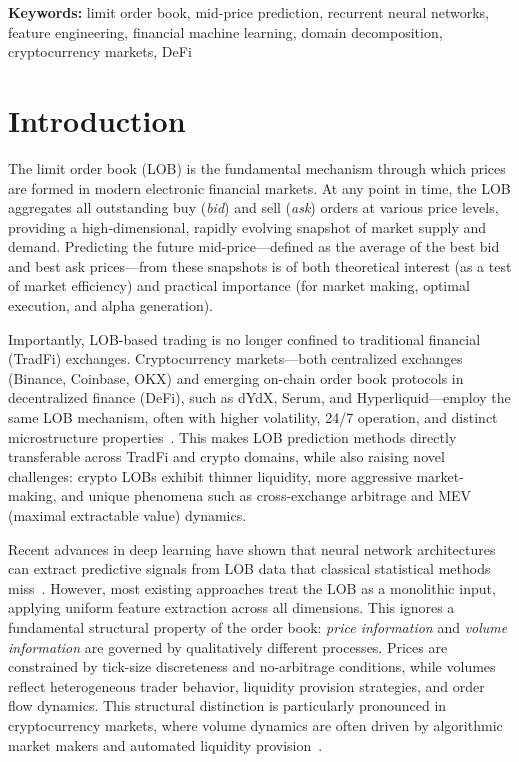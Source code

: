 \documentclass[11pt,a4paper]{article}
\begin{document}
\textbf{Keywords:} limit order book, mid-price prediction, recurrent neural networks, feature engineering, financial machine learning, domain decomposition, cryptocurrency markets, DeFi

\section{Introduction}
\label{sec:intro}

The limit order book (LOB) is the fundamental mechanism through which prices are formed in modern electronic financial markets. At any point in time, the LOB aggregates all outstanding buy (\emph{bid}) and sell (\emph{ask}) orders at various price levels, providing a high-dimensional, rapidly evolving snapshot of market supply and demand. Predicting the future mid-price---defined as the average of the best bid and best ask prices---from these snapshots is of both theoretical interest (as a test of market efficiency) and practical importance (for market making, optimal execution, and alpha generation).

Importantly, LOB-based trading is no longer confined to traditional financial (TradFi) exchanges. Cryptocurrency markets---both centralized exchanges (Binance, Coinbase, OKX) and emerging on-chain order book protocols in decentralized finance (DeFi), such as dYdX, Serum, and Hyperliquid---employ the same LOB mechanism, often with higher volatility, 24/7 operation, and distinct microstructure properties~\cite{fang2022crypto}. This makes LOB prediction methods directly transferable across TradFi and crypto domains, while also raising novel challenges: crypto LOBs exhibit thinner liquidity, more aggressive market-making, and unique phenomena such as cross-exchange arbitrage and MEV (maximal extractable value) dynamics.

Recent advances in deep learning have shown that neural network architectures can extract predictive signals from LOB data that classical statistical methods miss~\cite{zhang2019deeplob, sirignano2019universal}. However, most existing approaches treat the LOB as a monolithic input, applying uniform feature extraction across all dimensions. This ignores a fundamental structural property of the order book: \emph{price information} and \emph{volume information} are governed by qualitatively different processes. Prices are constrained by tick-size discreteness and no-arbitrage conditions, while volumes reflect heterogeneous trader behavior, liquidity provision strategies, and order flow dynamics. This structural distinction is particularly pronounced in cryptocurrency markets, where volume dynamics are often driven by algorithmic market makers and automated liquidity provision~\cite{capponi2021adoption}.
\end{document}
